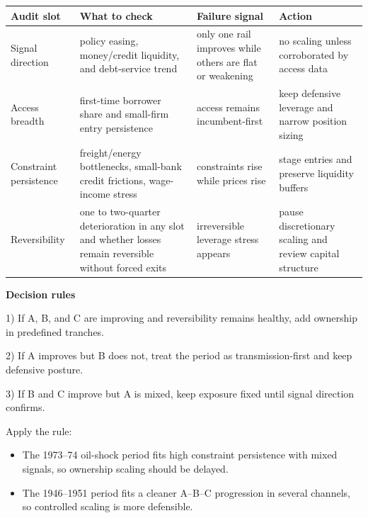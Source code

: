 \documentclass[11pt,openany]{book}
\begin{document}
\begin{center}
\small
\begin{tabularx}{\textwidth}{>{\raggedright\arraybackslash}p{}>{\raggedright\arraybackslash}p{}>{\raggedright\arraybackslash}p{}X}
\toprule
\textbf{Audit slot} & \textbf{What to check} & \textbf{Failure signal} & \textbf{Action} \\
\midrule
Signal direction & policy easing, money/credit liquidity, and debt-service trend & only one rail improves while others are flat or weakening & no scaling unless corroborated by access data \\
Access breadth & first-time borrower share and small-firm entry persistence & access remains incumbent-first & keep defensive leverage and narrow position sizing \\
Constraint persistence & freight/energy bottlenecks, small-bank credit frictions, wage-income stress & constraints rise while prices rise & stage entries and preserve liquidity buffers \\
Reversibility & one to two-quarter deterioration in any slot and whether losses remain reversible without forced exits & irreversible leverage stress appears & pause discretionary scaling and review capital structure \\
\bottomrule
\end{tabularx}
\normalsize
\end{center}

\begin{signalbox}
\textbf{Decision rules}\par
1) If A, B, and C are improving and reversibility remains healthy, add ownership in predefined tranches.\par
2) If A improves but B does not, treat the period as transmission-first and keep defensive posture.\par
3) If B and C improve but A is mixed, keep exposure fixed until signal direction confirms.
\end{signalbox}

Apply the rule:
\begin{itemize}
  \item The 1973--74 oil-shock period fits high constraint persistence with mixed signals, so ownership scaling should be delayed.
  \item The 1946--1951 period fits a cleaner A--B--C progression in several channels, so controlled scaling is more defensible.
\end{itemize}
\end{document}
